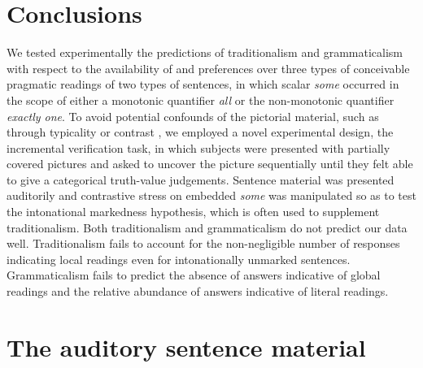 \documentclass[fleqn,reqno,10pt,draft]{article}
\begin{document}
\section{Conclusions}
\label{sec:conclusions}

We tested experimentally the predictions of traditionalism and
grammaticalism with respect to the availability of and preferences
over three types of conceivable pragmatic readings of two types of
sentences, in which scalar \emph{some} occurred in the scope of either
a monotonic quantifier \emph{all} or the non-monotonic quantifier
\emph{exactly one}. To avoid potential confounds of the pictorial
material, such as through typicality or contrast
\citep{Tielvan-Tiel2012:Embedded-Scalar,GeurtsTielvan-Tiel2013:Scalar-expressi},
we employed a novel experimental design, the incremental verification
task, in which subjects were presented with partially covered pictures
and asked to uncover the picture sequentially until they felt able to
give a categorical truth-value judgements. Sentence material was
presented auditorily and contrastive stress on embedded \emph{some}
was manipulated so as to test the intonational markedness hypothesis,
which is often used to supplement traditionalism. Both traditionalism
and grammaticalism do not predict our data well.  Traditionalism fails
to account for the non-negligible number of responses indicating local
readings even for intonationally unmarked sentences. Grammaticalism
fails to predict the absence of answers indicative of global readings
and the relative abundance of answers indicative of literal readings.



\newpage

\appendix

\section{The auditory sentence material}
\label{sec:audit-sent-mater}
\end{document}
